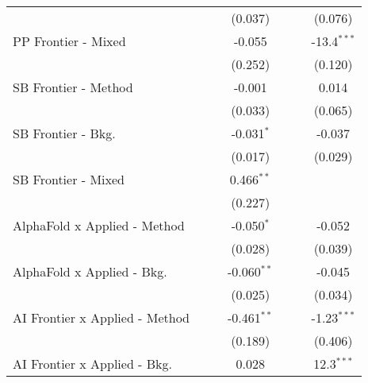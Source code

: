 \begin{tabular}{lcccccc}
                                  &                &               & (0.037)       &                &              & (0.076)\\   
   PP Frontier - Mixed            &                &               & -0.055        &                &              & -13.4$^{***}$\\   
                                  &                &               & (0.252)       &                &              & (0.120)\\   
   SB Frontier - Method           &                &               & -0.001        &                &              & 0.014\\   
                                  &                &               & (0.033)       &                &              & (0.065)\\   
   SB Frontier - Bkg.             &                &               & -0.031$^{*}$  &                &              & -0.037\\   
                                  &                &               & (0.017)       &                &              & (0.029)\\   
   SB Frontier - Mixed            &                &               & 0.466$^{**}$  &                &              &   \\   
                                  &                &               & (0.227)       &                &              &   \\   
   AlphaFold x Applied - Method   &                &               & -0.050$^{*}$  &                &              & -0.052\\   
                                  &                &               & (0.028)       &                &              & (0.039)\\   
   AlphaFold x Applied - Bkg.     &                &               & -0.060$^{**}$ &                &              & -0.045\\   
                                  &                &               & (0.025)       &                &              & (0.034)\\   
   AI Frontier x Applied - Method &                &               & -0.461$^{**}$ &                &              & -1.23$^{***}$\\   
                                  &                &               & (0.189)       &                &              & (0.406)\\   
   AI Frontier x Applied - Bkg.   &                &               & 0.028         &                &              & 12.3$^{***}$\\   

\end{tabular}
